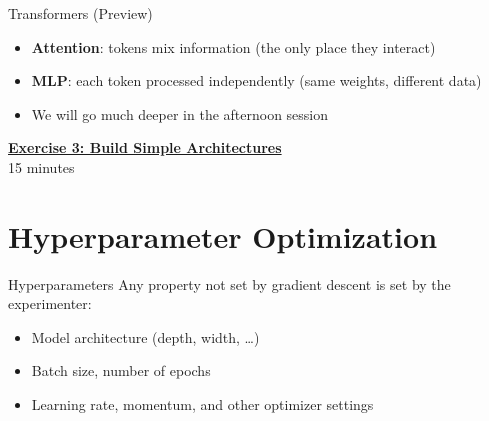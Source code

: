 \documentclass[aspectratio=169]{beamer}
\begin{document}
\begin{frame}{Transformers (Preview)}
\begin{center}
\end{center}
\vspace{-0.5em}
\begin{itemize}
\item \textbf{Attention}: tokens mix information (the only place they interact)
\item \textbf{MLP}: each token processed independently (same weights, different data)
\item We will go much deeper in the afternoon session
\end{itemize}
\hfill{\tiny \cite{vaswani2017}}\quad
\end{frame}

\begin{frame}{}
\centering
\Large \href{https://colab.research.google.com/github/iliad-team/iliad-intensive-C.1.1/blob/main/lectures/01_a_ml_foundations/exercises/03_architectures/notebook.ipynb}{\textbf{Exercise 3: Build Simple Architectures}} \\[1em]
\normalsize 15 minutes \\[1em]
\end{frame}

\section{Hyperparameter Optimization}

\begin{frame}{Hyperparameters}
Any property not set by gradient descent is set by the experimenter:
\begin{itemize}
\item Model architecture (depth, width, \ldots)
\item Batch size, number of epochs
\item Learning rate, momentum, and other optimizer settings
\end{itemize}
\end{frame}
\end{document}

